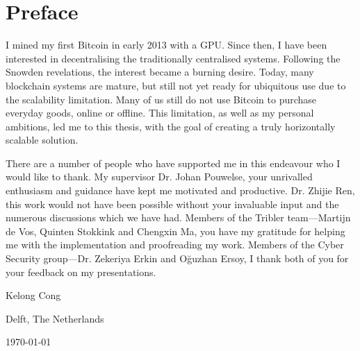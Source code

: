 \chapter*{Preface}
I mined my first Bitcoin in early 2013 with a GPU.
Since then, I have been interested in decentralising the traditionally centralised systems.
Following the Snowden revelations, the interest became a burning desire.
Today, many blockchain systems are mature, but still not yet ready for ubiquitous use due to the scalability limitation.
Many of us still do not use Bitcoin to purchase everyday goods, online or offline.
This limitation, as well as my personal ambitions, led me to this thesis,
with the goal of creating a truly horizontally scalable solution.

\vspace{1\baselineskip}

\noindent
There are a number of people who have supported me in this endeavour who I would like to thank.
My supervisor Dr. Johan Pouwelse, your unrivalled enthusiasm and guidance have kept me motivated and productive.
Dr. Zhijie Ren, this work would not have been possible without your invaluable input and the numerous discussions which we have had.
Members of the Tribler team---Martijn de Vos, Quinten Stokkink and Chengxin Ma,
you have my gratitude for helping me with the implementation and proofreading my work.
Members of the Cyber Security group---Dr. Zekeriya Erkin and O\u{g}uzhan Ersoy,
I thank both of you for your feedback on my presentations.

\vspace{1\baselineskip}

\noindent
Kelong Cong

\vspace{1\baselineskip}

\noindent
Delft, The Netherlands

\noindent
\today
